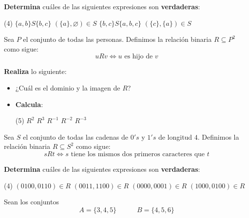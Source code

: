 \documentclass[oneside]{style}
\begin{document}
\begin{questions}[label=\protect\circled{\bfseries\arabic*}]
{        \textbf{Determina} cuáles de las siguientes expresiones son 
        \textbf{verdaderas}:
        \begin{tasks}(4)
            \task $\{a,b\} S \{b,c\}$
            \task $(\{a\}, \varnothing) \in S$
            \task $\{b, c\} S \{a,b,c\}$
            \task $(\{c\}, \{a\}) \in S$
        \end{tasks}
    }

    \question
    {
        Sea $P$ el conjunto de todas las personas. Definimos la relación 
        binaria $R \subseteq P^2$ como sigue:
        \begin{equation*}
            u R v \Leftrightarrow u \text{ es hijo de } v
        \end{equation*}

        \textbf{Realiza} lo siguiente:
        \begin{itemize}
            \item ¿Cuál es el dominio y la imagen de $R$?
            \item \textbf{Calcula}:
            \begin{tasks}(5)
                \task $R^2$
                \task $R^3$
                \task $R^{-1}$
                \task $R^{-2}$
                \task $R^{-3}$
            \end{tasks}
        \end{itemize}
    }

    \question
    {
        Sea $S$ el conjunto de todas las cadenas de $0's$ y $1's$ de longitud 
        $4$. Definimos la relación binaria $R \subseteq S^2$ como sigue:
        \begin{equation*}
            s R t \Leftrightarrow s \text{ tiene los mismos dos 
            primeros caracteres que } t
        \end{equation*}

        \textbf{Determina} cuáles de las siguientes expresiones son 
        \textbf{verdaderas}:
        \begin{tasks}(4)
            \task $(0100, 0110) \in R$
            \task $(0011, 1100) \in R$
            \task $(0000, 0001) \in R$
            \task $(1000, 0100) \in R$
        \end{tasks}
    }

    \question
    {
        Sean los conjuntos
        \begin{equation*}
            A = \{3,4,5\} \quad \quad \quad 
            B = \{4,5,6\}
        \end{equation*}
        
}
\end{questions}
\end{document}
